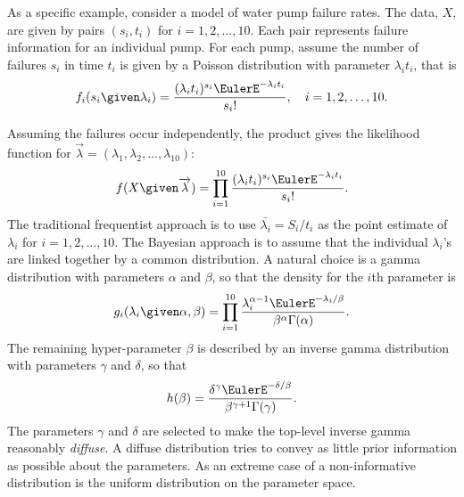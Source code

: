 \documentclass[12pt]{article}
\begin{document}
As a specific example, consider a model of water pump failure rates.
The data, \( X \), are given by pairs \( (s_i, t_i) \) for \( i = 1,2,
\dots, 10 \).  Each pair represents failure information for an
individual pump.  For each pump, assume the number of failures \( s_i \)
in time \( t_i \) is given by a Poisson distribution with parameter \(
\lambda_i t_i \), that is
\[
    f_i(s_i \given \lambda_i) = \frac{(\lambda_i t_i)^{s_i} \EulerE^{-\lambda_i
    t_i}}{s_i!}, \quad i = 1,2, \dots, 10.
\]

Assuming the failures occur independently, the product gives the
likelihood function for \( \overrightarrow{\lambda} = (\lambda_1,
\lambda_2, \dots, \lambda_{10}) \):
\[
    f(X \given \overrightarrow{\lambda}) = \prod\limits_{i=1}^{10} \frac
    {(\lambda_i t_i)^{s_i} \EulerE^{-\lambda_i t_i}}{s_i!}.
\] The traditional frequentist approach is to use \( \bar{\lambda_i} = S_i/t_i
\) as the point estimate of \( \lambda_i \) for \( i = 1,2, \dots, 10 \).
The Bayesian approach is to assume that the individual \( \lambda_i \)'s
are linked together by a common distribution.  A natural choice is a
gamma distribution with parameters \( \alpha \) and \( \beta \), so that
the density for the \( i \)th parameter is
\[
    g_i(\lambda_i \given \alpha, \beta) =\prod\limits_{i=1}^{10} \frac{\lambda_i^
    {\alpha-1} \EulerE^{-\lambda_i/\beta}}{\beta^{\alpha} \Gamma(\alpha)}.
\] The remaining hyper-parameter \( \beta \) is described by an inverse
gamma distribution with parameters \( \gamma \) and \( \delta \), so
that
\[
    h(\beta) = \frac{\delta^{\gamma} \EulerE^{-\delta/\beta}}{\beta^{\gamma+1}
    \Gamma(\gamma)}.
\] The parameters \( \gamma \) and \( \delta \) are selected to make the
top-level inverse gamma reasonably \emph{diffuse}.  A diffuse
distribution tries to convey as little prior information as possible
about the parameters.  As an extreme case of a non-informative
distribution is the uniform distribution on the parameter space.
\end{document}
